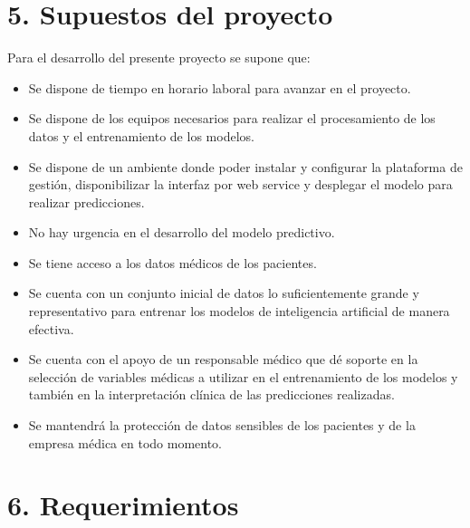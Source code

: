 \documentclass[
11pt, %
]{charter}
\begin{document}
\section{5. Supuestos del proyecto}
\label{sec:supuestos}

Para el desarrollo del presente proyecto se supone que:

\begin{itemize}
	\item Se dispone de tiempo en horario laboral para avanzar en el proyecto.
	\item Se dispone de los equipos necesarios para realizar el procesamiento de los datos y el entrenamiento de los modelos.
	\item Se dispone de un ambiente donde poder instalar y configurar la plataforma de gestión, disponibilizar la interfaz por web service y desplegar el modelo para realizar predicciones. 
	\item No hay urgencia en el desarrollo del modelo predictivo.		
	\item Se tiene acceso a los datos médicos de los pacientes.
	\item Se cuenta con un conjunto inicial de datos lo suficientemente grande y representativo para entrenar los modelos de inteligencia artificial de manera efectiva.
	\item Se cuenta con el apoyo de un responsable médico que dé soporte en la selección de variables médicas a utilizar en el entrenamiento de los modelos y también en la interpretación clínica de las predicciones realizadas.
	\item Se mantendrá la protección de datos sensibles de los pacientes y de la empresa médica en todo momento.		
\end{itemize}

\section{6. Requerimientos}
\label{sec:requerimientos}
\end{document}
